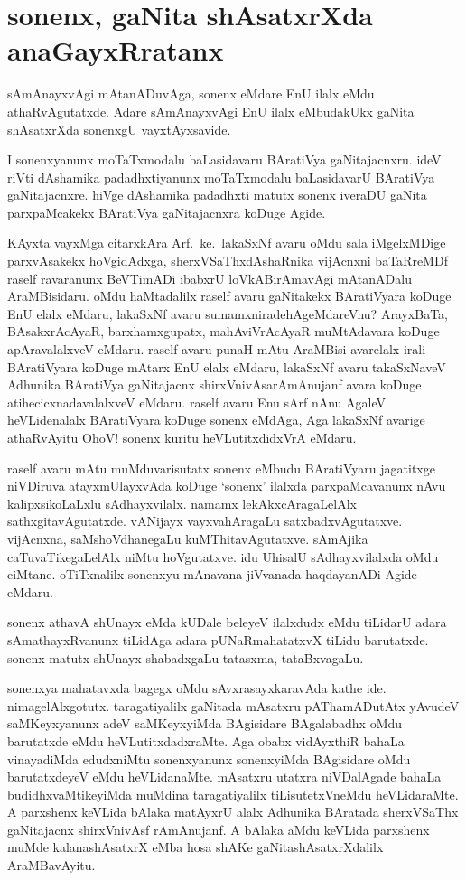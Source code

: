 \chapter{sonenx, gaNita shAsatxrXda anaGayxRratanx}
\vskip -20pt

sAmAnayxvAgi mAtanADuvAga, sonenx eMdare EnU ilalx eMdu athaRvAgutatxde. Adare sAmAnayxvAgi EnU ilalx eMbudakUkx gaNita shAsatxrXda sonenxgU vayxtAyxsavide.

I sonenxyanunx moTaTxmodalu baLasidavaru BAratiVya gaNitajacnxru. ideV riVti dAshamika padadhxtiyanunx moTaTxmodalu baLasidavarU BAratiVya gaNitajacnxre. hiVge dAshamika padadhxti matutx sonenx iveraDU gaNita parxpaMcakekx BAratiVya gaNitajacnxra koDuge Agide.

KAyxta vayxMga citarxkAra Arf.~ke.\ lakaSxNf avaru oMdu sala iMgelxMDige parxvAsakekx hoVgidAdxga, sherxVSaThxdAshaRnika vijAcnxni baTaRreMDf raself ravaranunx BeVTimADi ibabxrU loVkABirAmavAgi mAtanADalu AraMBisidaru. oMdu haMtadalilx raself avaru gaNitakekx BAratiVyara koDuge EnU elalx eMdaru, lakaSxNf avaru sumamxnirade\-hAgeMdareVnu? ArayxBaTa, BAsakxrAcAyaR, barxhamxgupatx, mahAviVrAcAyaR muMtA\-davara koDuge apAravalalxveV eMdaru. raself avaru punaH mAtu AraMBisi avarelalx irali BAratiVyara koDuge mAtarx EnU elalx eMdaru, lakaSxNf avaru takaSxNaveV Adhunika BAratiVya gaNitajacnx shirxVnivAsarAmAnujanf avara koDuge atihecicxnadavalalxveV \-eMdaru. raself avaru Enu sArf nAnu AgaleV heVLidenalalx BAratiVyara koDuge \-sonenx eMdAga, Aga lakaSxNf avarige athaRvAyitu OhoV! sonenx kuritu heVLutitxdidxVrA eMdaru.

raself avaru mAtu muMduvarisutatx sonenx eMbudu BAratiVyaru jagatitxge niVDiruva atayxmUlayxvAda koDuge `sonenx' ilalxda parxpaMcavanunx nAvu kalipxsikoLaLxlu sAdhayxvilalx. namamx lekAkxcAragaLelAlx sathxgitavAgutatxde. vANijayx vayxvahAragaLu satxbadxvAgu\-tatxve. vijAcnxna, saMshoVdhanegaLu kuMThitavAgutatxve. sAmAjika caTuvaTikegaLelAlx niMtu hoVgutatxve. idu UhisalU sAdhayxvilalxda oMdu ciMtane. oTiTxnalilx sonenxyu mAnavana jiVvanada haqdayanADi Agide eMdaru. 

sonenx athavA shUnayx eMda kUDale beleyeV ilalxdudx eMdu tiLidarU adara sAmathayxRvanunx tiLidAga adara pUNaRmahatatxvX tiLidu barutatxde. sonenx matutx shUnayx shabadxgaLu tatasxma, tataBxvagaLu.

sonenxya mahatavxda bagegx oMdu sAvxrasayxkaravAda kathe ide. nimagelAlxgotutx. taragatiyalilx gaNitada mAsatxru pAThamADutAtx yAvudeV saMKeyxyanunx adeV saMKeyxyiMda BAgisidare BAgalabadhx oMdu barutatxde eMdu heVLutitxdadxraMte. Aga obabx \-vidAyxthiR bahaLa vinayadiMda edudxniMtu sonenxyanunx sonenxyiMda BAgisidare oMdu barutatxdeyeV eMdu heVLidanaMte. mAsatxru utatxra niVDalAgade bahaLa budidhx\-vaMtikeyiMda muMdina taragatiyalilx tiLisutetxVneMdu heVLidaraMte. A parxshenx keVLida bAlaka matAyxrU alalx Adhunika BAratada sherxVSaThx gaNitajacnx shirxVnivAsf rAmAnujanf. A bAlaka aMdu keVLida parxshenx muMde kalanashAsatxrX eMba hosa shAKe gaNitashAsatxrXdalilx \-AraMBavAyitu.

